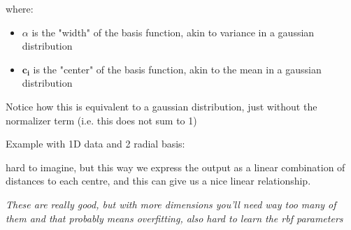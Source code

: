 \documentclass{article}
\renewcommand\vec{\mathbf}
\begin{document}
{    where: 
    \begin{itemize}[noitemsep]
        \item $\alpha$ is the "width" of the basis function, akin to variance in a gaussian distribution
        \item $\vec{c_{i}}$ is the "center" of the basis function, akin to the mean in a gaussian distribution
    \end{itemize}
    Notice how this is equivalent to a gaussian distribution, just without the normalizer term (i.e. this does not sum to 1)

    Example with 1D data and 2 radial basis:
    \begin{center}
    \end{center}

    hard to imagine, but this way we express the output as a linear combination of distances to each centre, and this can give us a nice linear relationship.
    
    \textit{\color{red} These are really good, but with more dimensions you'll need way too many of them and that probably means overfitting, also hard to learn the rbf parameters}
}
\end{document}
